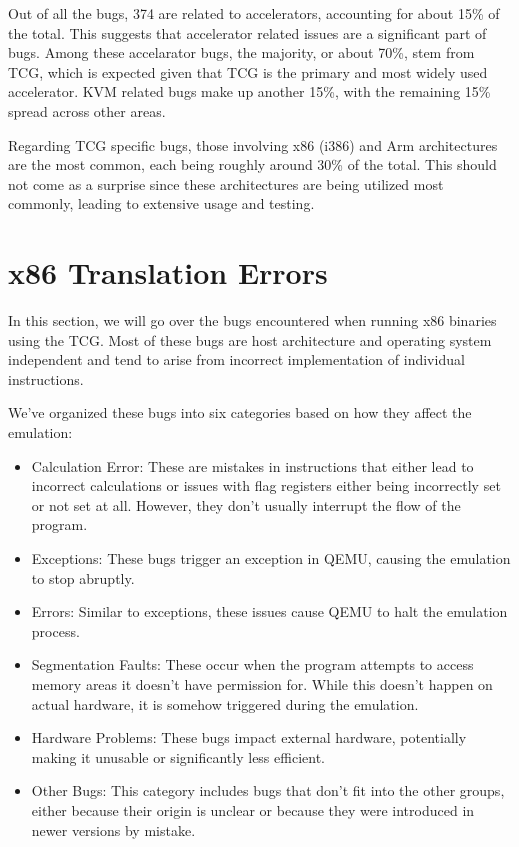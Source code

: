 Out of all the bugs, 374 are related to accelerators, accounting for about 15\% of the total.
This suggests that accelerator related issues are a significant part of bugs.
Among these accelarator bugs, the majority, or about 70\%, stem from TCG, which is expected given that TCG is the primary and most widely used accelerator.
KVM related bugs make up another 15\%, with the remaining 15\% spread across other areas.

Regarding TCG specific bugs, those involving x86 (i386) and Arm architectures are the most common, each being roughly around 30\% of the total.
This should not come as a surprise since these architectures are being utilized most commonly, leading to extensive usage and testing.

\section{x86 Translation Errors}
In this section, we will go over the bugs encountered when running x86 binaries using the TCG.
Most of these bugs are host architecture and operating system independent and tend to arise from incorrect implementation of individual instructions.

We've organized these bugs into six categories based on how they affect the emulation:
\begin{itemize}
    \item Calculation Error: These are mistakes in instructions that either lead to incorrect calculations or issues with flag registers either being incorrectly set or not set at all. However, they don't usually interrupt the flow of the program.
    \item Exceptions: These bugs trigger an exception in QEMU, causing the emulation to stop abruptly.
    \item Errors: Similar to exceptions, these issues cause QEMU to halt the emulation process.
    \item Segmentation Faults: These occur when the program attempts to access memory areas it doesn't have permission for. While this doesn't happen on actual hardware, it is somehow triggered during the emulation.
    \item Hardware Problems: These bugs impact external hardware, potentially making it unusable or significantly less efficient.
    \item Other Bugs: This category includes bugs that don't fit into the other groups, either because their origin is unclear or because they were introduced in newer versions by mistake.
\end{itemize}

